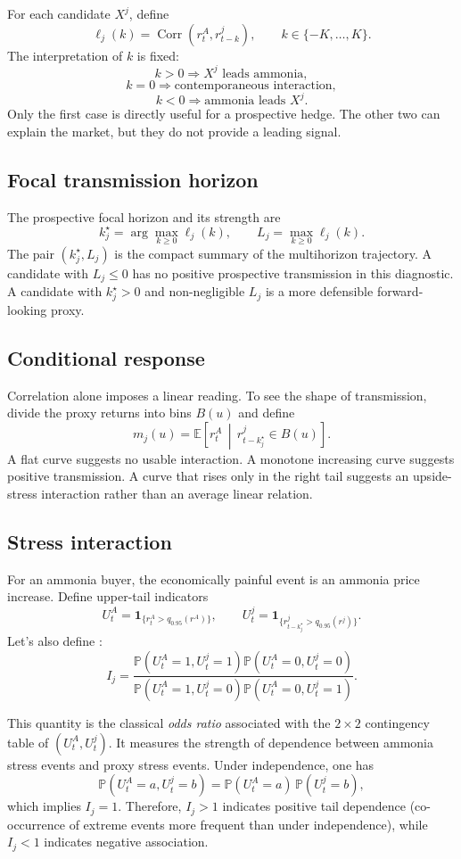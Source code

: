 \documentclass[11pt]{article}
\newcommand{\E}{\mathbb E}
\newcommand{\Prob}{\mathbb P}
\newcommand{\Corr}{\operatorname{Corr}}
\newcommand{\1}{\mathbf 1}
\begin{document}
For each candidate \(X^j\), define
\[
\ell_j(k)
=
\Corr(r^A_t,r^j_{t-k}),
\qquad
k\in\{-K,\ldots,K\}.
\]
The interpretation of \(k\) is fixed:
\[
k>0
\Rightarrow
X^j\text{ leads ammonia},
\]
\[
k=0
\Rightarrow
\text{contemporaneous interaction},
\]
\[
k<0
\Rightarrow
\text{ammonia leads }X^j.
\]
Only the first case is directly useful for a prospective hedge. The other two can explain the market, but they do not provide a leading signal.

\subsection{Focal transmission horizon}

The prospective focal horizon and its strength are
\[
k_j^\star
=
\arg\max_{k\geq0}\ell_j(k),
\qquad
L_j
=
\max_{k\geq0}\ell_j(k).
\]
The pair \((k_j^\star,L_j)\) is the compact summary of the multihorizon trajectory. A candidate with \(L_j\leq0\) has no positive prospective transmission in this diagnostic. A candidate with \(k_j^\star>0\) and non-negligible \(L_j\) is a more defensible forward-looking proxy.

\subsection{Conditional response}

Correlation alone imposes a linear reading. To see the shape of transmission, divide the proxy returns into bins \(B(u)\) and define
\[
m_j(u)
=
\E\!\left[
r^A_t
\,\middle|\,
r^j_{t-k_j^\star}\in B(u)
\right].
\]
A flat curve suggests no usable interaction. A monotone increasing curve suggests positive transmission. A curve that rises only in the right tail suggests an upside-stress interaction rather than an average linear relation.

\subsection{Stress interaction}

For an ammonia buyer, the economically painful event is an ammonia price increase. Define upper-tail indicators
\[
U^A_t
=
\1_{\{r^A_t>q_{0.95}(r^A)\}},
\qquad
U^j_t
=
\1_{\{r^j_{t-k_j^\star}>q_{0.95}(r^j)\}} .
\]
Let's also define : 
\[
I_j
=
\frac{
\Prob(U^A_t=1,U^j_t=1)
\Prob(U^A_t=0,U^j_t=0)
}{
\Prob(U^A_t=1,U^j_t=0)
\Prob(U^A_t=0,U^j_t=1)
}.
\]

This quantity is the classical \emph{odds ratio} associated with the $2 \times 2$ contingency table of $(U^A_t, U^j_t)$. It measures the strength of dependence between ammonia stress events and proxy stress events. Under independence, one has
\[
\mathbb{P}(U^A_t = a, U^j_t = b) = \mathbb{P}(U^A_t = a)\,\mathbb{P}(U^j_t = b),
\]
which implies $I_j = 1$. Therefore, $I_j > 1$ indicates positive tail dependence (co-occurrence of extreme events more frequent than under independence), while $I_j < 1$ indicates negative association.
\end{document}
